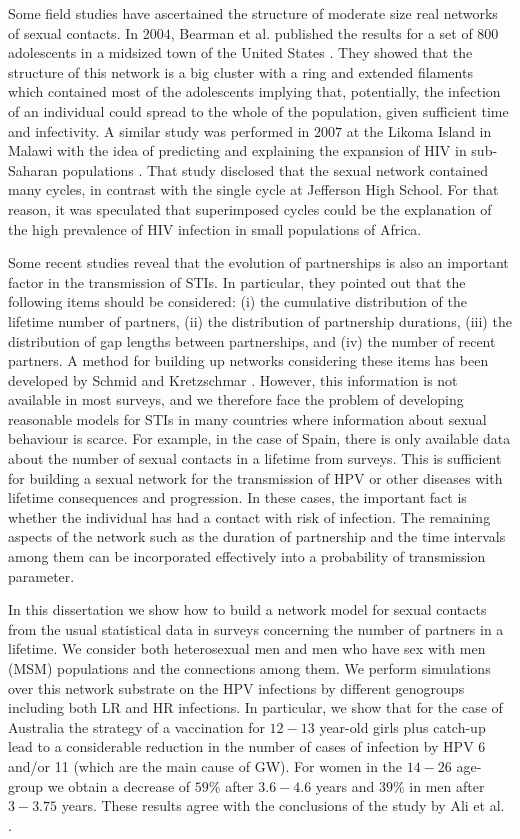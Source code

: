 Some field studies have ascertained the structure of moderate size real networks of sexual contacts. In $2004$, Bearman et al. 
published the results for a set of $800$ adolescents in a midsized town of the United States \cite{bearman2004chains}. They  showed that the structure of this network is a big cluster with a ring and extended filaments which contained most of the adolescents implying that, potentially, the infection of an individual could spread to the whole of the population, given sufficient time and infectivity. A similar study was performed in $2007$ at the Likoma Island in Malawi with the idea of predicting and explaining the expansion of HIV in sub-Saharan populations \cite{helleringer2007sexual}. That study disclosed  that the sexual network contained many cycles, in contrast with the single cycle at Jefferson High School. For that reason, it was speculated that superimposed cycles could be the explanation of the high prevalence of HIV infection in small populations of Africa.

Some recent studies reveal that the evolution of partnerships is also an important factor in the transmission of
STIs. In particular, they pointed out that the following items should be considered: (i) the cumulative distribution of the
lifetime number of partners, (ii) the distribution of partnership durations, (iii) the distribution of gap lengths between 
partnerships, and (iv) the number of recent partners. A method for building up networks considering these items has been developed by Schmid and Kretzschmar \cite{schmid2012determinants}. However, this information is not available in most surveys, and we therefore face the problem of developing reasonable models for STIs in many countries where information about
sexual behaviour is scarce. For example, in the case of Spain, there is only available data about the number of sexual contacts in a lifetime from surveys. This is sufficient for building a sexual network for the transmission of HPV or other diseases with lifetime consequences and progression. In these cases, the important fact is whether the individual has had a contact with risk of infection. The remaining aspects of the network such as the duration of partnership and the time intervals among them can be incorporated effectively into a probability of transmission parameter.

In this dissertation we show how to build a network model for sexual contacts from the usual statistical data in surveys concerning the number of partners in a lifetime. We consider both heterosexual men and men who have sex with men (MSM) populations and the connections among them. We perform simulations over this network substrate on the HPV infections by different genogroups including both LR and HR infections. In particular, we show that for the case of Australia the strategy of a vaccination for $12-13$ year-old girls plus catch-up lead to a considerable reduction in the number of cases of infection by HPV 6 and/or 11 (which are the main cause of GW). For women in the $14-26$ age-group we obtain a decrease of $59\%$ after $3.6-4.6$ years and $39\%$ in men after $3-3.75$ years. These results agree with the conclusions of the study by Ali et al. \cite{ali2013genital}.

